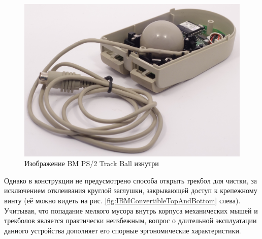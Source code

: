 \documentclass[11pt, a4paper]{article}
\begin{document}
\begin{figure}[h]
    \centering
    \includegraphics[scale=0.5]{1992_ibm_convertible/202.JPG}
    \caption{Изображение BM PS/2 Track Ball изнутри}
    \label{fig:IBMConvertibleInside}
\end{figure}

Однако в конструкции не предусмотрено способа открыть трекбол для чистки, за исключением отклеивания круглой заглушки, закрывающей доступ к крепежному винту (её можно видеть на рис. \ref{fig:IBMConvertibleTopAndBottom} слева). Учитывая, что попадание мелкого мусора внутрь корпуса механических мышей и трекболов является практически неизбежным, вопрос о длительной эксплуатации данного устройства дополняет его спорные эргономические характеристики.
\end{document}
